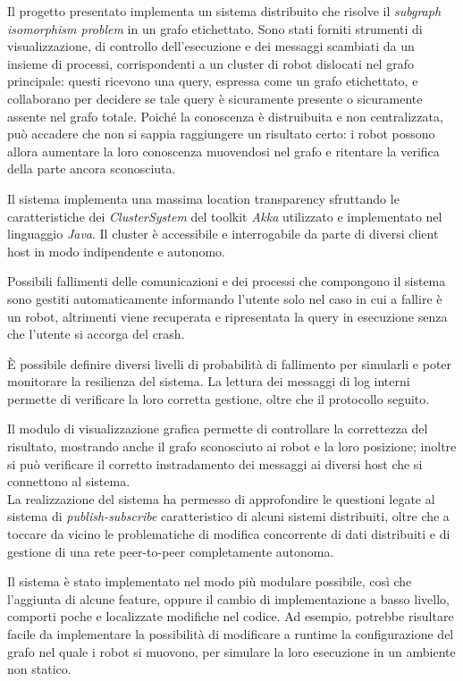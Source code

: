 Il progetto presentato implementa un sistema distribuito che risolve
il \emph{subgraph isomorphism problem} in un grafo etichettato.
Sono stati forniti strumenti di visualizzazione, di controllo
dell'esecuzione e dei messaggi scambiati da un insieme di processi,
corrispondenti a un cluster di robot dislocati nel grafo principale:
questi ricevono una query, espressa come un grafo etichettato,
e collaborano per decidere se tale query è sicuramente presente
o sicuramente assente nel grafo totale. Poiché la conoscenza è
distruibuita e non centralizzata, può accadere che non si sappia
raggiungere un risultato certo: i robot possono allora aumentare
la loro conoscenza muovendosi nel grafo e ritentare la verifica
della parte ancora sconosciuta.

Il sistema implementa una massima location transparency sfruttando
le caratteristiche dei \emph{ClusterSystem} del toolkit \emph{Akka}
utilizzato e implementato nel linguaggio \emph{Java}.
Il cluster è accessibile e interrogabile da parte di diversi
client host in modo indipendente e autonomo.

Possibili fallimenti delle comunicazioni e dei processi che compongono
il sistema sono gestiti automaticamente informando l'utente
solo nel caso in cui a fallire è un robot, altrimenti viene recuperata
e ripresentata la query in esecuzione senza che l'utente si
accorga del crash.

\`E possibile definire diversi livelli di probabilità di fallimento
per simularli e poter monitorare la resilienza del sistema.
La lettura dei messaggi di log interni permette di verificare
la loro corretta gestione, oltre che il protocollo seguito.

Il modulo di visualizzazione grafica permette di controllare
la correttezza del risultato, mostrando anche il grafo sconosciuto
ai robot e la loro posizione; inoltre si può verificare il
corretto instradamento dei messaggi ai diversi host che si connettono
al sistema.\\

La realizzazione del sistema ha permesso di approfondire
le questioni legate al sistema di \emph{publish-subscribe}
caratteristico di alcuni sistemi distribuiti, oltre che a
toccare da vicino le problematiche di modifica concorrente
di dati distribuiti e di gestione di una rete peer-to-peer
completamente autonoma.

Il sistema è stato implementato nel modo più modulare possibile,
così che l'aggiunta di alcune feature, oppure il cambio di
implementazione a basso livello, comporti poche e localizzate
modifiche nel codice.
Ad esempio, potrebbe risultare facile da implementare la possibilità
di modificare a runtime la configurazione del grafo nel quale i
robot si muovono, per simulare la loro esecuzione in un
ambiente non statico.

